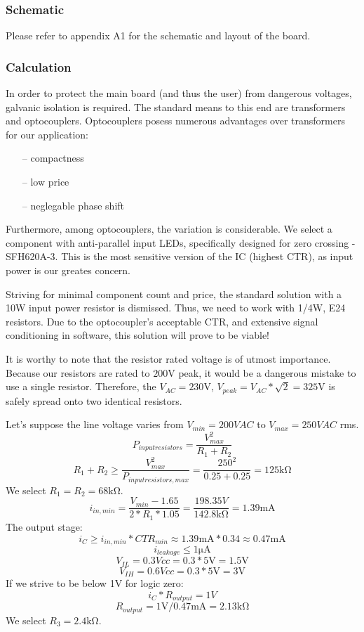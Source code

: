 \subsubsection{Schematic}
Please refer to appendix A1 for the schematic and layout of the board.

\subsubsection{Calculation}
In order to protect the main board (and thus the user) from dangerous voltages, galvanic isolation is required.
The standard means to this end are transformers and optocouplers.
Optocouplers posess numerous advantages over transformers for our application:
\begin{itemize}
\item[--]{compactness}
\item[--]{low price}
\item[--]{neglegable phase shift}
\end{itemize}
Furthermore, among optocouplers, the variation is considerable.
We select a component with anti-parallel input LEDs, specifically designed for zero crossing - SFH620A-3.
This is the most sensitive version of the IC (highest CTR), as input power is our greates concern.
\par
Striving for minimal component count and price, the standard solution with a 10W input power resistor is dismissed.
Thus, we need to work with 1/4W, E24 resistors.
Due to the optocoupler's acceptable CTR, and extensive signal conditioning in software, this solution will prove to be viable!
\par
It is worthy to note that the resistor rated voltage is of utmost importance.
Because our resistors are rated to $200\si{\volt}$ peak, it would be a dangerous mistake to use a single resistor.
Therefore, the $V_{AC} = 230\si{\volt}$, $V_{peak} = V_{AC} * \sqrt{2} = 325\si{\volt}$ is safely spread onto two identical resistors.
\par
Let's suppose the line voltage varies from $V_{min} = 200VAC$ to $V_{max} = 250VAC$ rms.
$$ P_{input resistors} = \frac{V_{max}^2}{R_1 + R_2}$$
$$ R_1 + R_2 \geq \frac{V_{max}^2}{P_{input resistors, max}} = \frac{250^2}{0.25+0.25} = 125\si{\kilo\ohm}$$
We select $R_1 = R_2 = 68\si{\kilo\ohm}$.
$$ i_{in, min} = \frac{V_{min} - 1.65}{2 * R_1 *1.05} = \frac{198.35V}{142.8\si{\kilo\ohm}} =  1.39\si{\milli\ampere}$$
The output stage:
$$  i_C \geq i_{in, min} * CTR_{min} \approx 1.39 \si{\milli\ampere} * 0.34 \approx 0.47\si{\milli\ampere} $$
$$ i_{leakage} \leq 1\si{\micro\ampere} $$
$$ V_{IL} = 0.3 Vcc = 0.3 * 5\si{\volt} = 1.5\si{\volt} $$
$$ V_{IH} = 0.6 Vcc = 0.3 * 5\si{\volt} = 3\si{\volt} $$
If we strive to be below 1V for logic zero:
$$ i_C * R_{output} = 1V $$
$$ R_{output} = 1\si{\volt} / 0.47\si{\milli\ampere} = 2.13\si{\kilo\ohm}$$
We select $R_3 = 2.4\si{\kilo\ohm}$.

